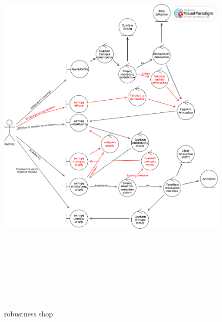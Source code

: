 \begin{figure}[!htb]
  \centering
    \centering
    \includegraphics[width=18cm,height=20cm]{robust_shop.png}
    \caption{robustness shop}
    \label{}
\end{figure}
